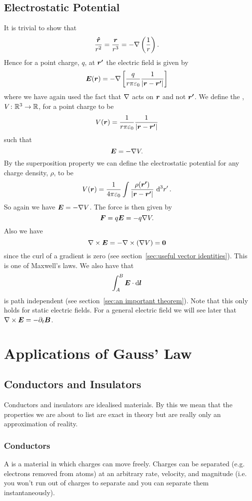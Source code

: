     \subsection{Electrostatic Potential}
    It is trivial to show that
    \[\frac{\bm{\hat{r}}}{r^2} = \frac{\bm{r}}{r^3} = -\nabla\left(\frac{1}{r}\right).\]
    Hence for a point charge, \(q\), at \(\bm{r'}\) the electric field is given by
    \[\bm{E}(\bm{r}) = -\nabla\left[\frac{q}{r\pi\varepsilon_0}\frac{1}{\abs{\bm{r} - \bm{r'}}}\right]\]
    where we have again used the fact that \(\nabla\) acts on \(\bm{r}\) and not \(\bm{r'}\).
    We define the , \(V\colon\mathbb{R}^3\to\mathbb{R}\), for a point charge to be
    \[V(\bm{r}) = \frac{1}{r\pi\varepsilon_0}\frac{1}{\abs{\bm{r} - \bm{r'}}}\]
    such that
    \[\bm{E} = -\nabla V.\]
    By the superposition property we can define the electrostatic potential for any charge density, \(\rho\), to be
    \[V(\bm{r}) = \frac{1}{4\pi\varepsilon_0} \int \frac{\rho(\bm{r'})}{\abs{\bm{r} - \bm{r'}}}\,\dd[3]{r'}.\]
    So again we have \(\bm{E} = -\nabla V\).
    The force is then given by
    \[\bm{F} = q\bm{E} = -q\nabla V.\]
    Also we have
    \[\nabla\times\bm{E} = -\nabla\times(\nabla V) = \bm{0}\]
    since the curl of a gradient is zero (see section~\ref{sec:useful vector identities}).
    This is one of Maxwell's laws.
    We also have that
    \[\int_A^B \bm{E}\cdot\dd{\bm{l}}\]
    is path independent (see section~\ref{sec:an important theorem}).
    Note that this only holds for static electric fields.
    For a general electric field we will see later that \(\nabla\times\bm{E} = -\partial_t\bm{B}\).
    
    \section{Applications of Gauss' Law}
    \subsection{Conductors and Insulators}
    Conductors and insulators are idealised materials.
    By this we mean that the properties we are about to list are exact in theory but are really only an approximation of reality.
    
    \subsubsection{Conductors}
    A  is a material in which charges can move freely.
    Charges can be separated (e.g. electrons removed from atoms) at an arbitrary rate, velocity, and magnitude (i.e. you won't run out of charges to separate and you can separate them instantaneously).
    
